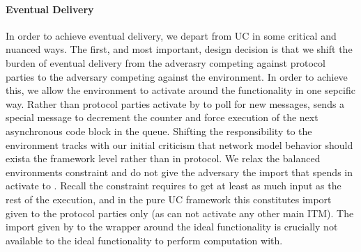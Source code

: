 \paragraph{Eventual Delivery}
In order to achieve eventual delivery, we depart from UC in some critical and nuanced ways.
The first, and most important, design decision is that we shift the burden of eventual delivery from the adverasry competing against protocol parties to the adversary competing against the environment. 
In order to achieve this, we allow the environment to activate \fwrapper around the functionality in one sepcific way. 
Rather than protocol parties activate by \Z to poll for new messages, \Z sends a special  message to decrement the counter and force execution of the next asynchronous code block in the queue.
Shifting the responsibility to the environment tracks with our initial criticism that network model behavior should exista the framework level rather than in protocol.
We relax the balanced environments constraint and do not give the adversary the import that \Z spends in activate \fwrapper to .
Recall the constraint requires \A to get at least as much input as the rest of the execution, and in the pure UC framework this constitutes import given to the protocol parties only (as \Z can not activate any other main ITM).
The import given by \Z to the wrapper around the ideal functionality is crucially not available to the ideal functionality to perform computation with.

